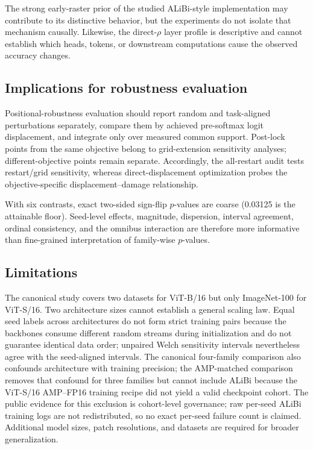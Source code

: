 \documentclass[preprint,12pt,authoryear]{elsarticle}
\begin{document}
The strong early-raster prior of the studied ALiBi-style implementation
may contribute to its distinctive behavior, but the experiments do not
isolate that mechanism causally. Likewise, the direct-$\rho$ layer profile
is descriptive and cannot establish which heads, tokens, or downstream
computations cause the observed accuracy changes.

\subsection{Implications for robustness evaluation}

Positional-robustness evaluation should report random and task-aligned
perturbations separately, compare them by achieved pre-softmax logit
displacement, and integrate only over measured common support. Post-lock
points from the same objective belong to grid-extension sensitivity analyses;
different-objective points remain separate. Accordingly, the all-restart
audit tests restart/grid sensitivity, whereas direct-displacement optimization
probes the objective-specific displacement--damage relationship.

With six contrasts, exact two-sided sign-flip $p$-values are coarse
(0.03125 is the attainable floor). Seed-level effects, magnitude,
dispersion, interval agreement, ordinal consistency, and the omnibus
interaction are therefore more informative than fine-grained interpretation
of family-wise $p$-values.

\subsection{Limitations}

The canonical study covers two datasets for ViT-B/16 but only
ImageNet-100 for ViT-S/16. Two architecture sizes cannot establish a
general scaling law. Equal seed labels across architectures do not form
strict training pairs because the backbones consume different random
streams during initialization and do not guarantee identical data order;
unpaired Welch sensitivity intervals nevertheless agree with the
seed-aligned intervals. The canonical four-family comparison also
confounds architecture with training precision; the AMP-matched comparison
removes that confound for three families but cannot include ALiBi because the
ViT-S/16 AMP--FP16 training recipe did not yield a valid checkpoint cohort.
The public evidence for this exclusion is cohort-level governance; raw
per-seed ALiBi training logs are not redistributed, so no exact per-seed
failure count is claimed. Additional model sizes, patch resolutions, and
datasets are required for broader generalization.
\end{document}
